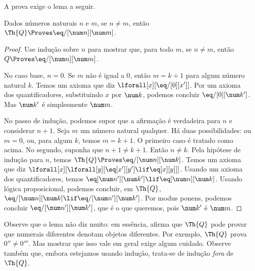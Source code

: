 \documentclass[../../../include/open-logic-section]{subfiles}
\begin{document}
A prova exige o lema a seguir.

\begin{lem}
 Dados números naturais $n$ e $m$, se
$n \neq m$, então $\Th{Q} \Proves \eq/[\num n][\num m]$.
\end{lem}

\begin{proof}
Use indução sobre $n$ para mostrar que, para todo $m$, se $n \neq m$,
então $Q \Proves \eq/[\num n][\num m]$.

No caso base, $n = 0$. Se $m$ não é igual a $0$, então $m = k + 1$
para algum número natural $k$. Temos um axioma que diz
$\lforall[x][\eq/[0][x']]$. Por um axioma dos quantificadores,
substituindo $x$ por $\num k$, podemos concluir
$\eq/[0][\num k']$. Mas $\num k'$ é simplesmente $\num m$.

No passo de indução, podemos supor que a afirmação é verdadeira para
$n$ e considerar $n+1$. Seja $m$ um número natural qualquer. Há duas
possibilidades: ou $m = 0$, ou, para algum $k$, temos $m = k+1$. O
primeiro caso é tratado como acima. No segundo, suponha que
$n+1 \neq k+1$. Então $n \neq k$. Pela hipótese de indução para $n$,
temos $\Th{Q} \Proves \eq/[\num n][\num k]$. Temos um axioma que diz
$\lforall[x][\lforall[y][\eq[x'][y'] \lif \eq[x][y]]]$. Usando um
axioma dos quantificadores, temos
$\eq[\num n'][\num k'] \lif \eq[\num n][\num k]$. Usando lógica
proposicional, podemos concluir, em $\Th{Q}$,
$\eq/[\num n][\num k] \lif \eq/[\num n'][\num k']$. Por modus ponens,
podemos concluir $\eq/[\num n'][\num k']$, que é o que queremos, pois
$\num k'$ é $\num m$.
\end{proof}

\begin{explain}
Observe que o lema não diz muito: em essência, afirma que $\Th{Q}$
pode provar que numerais diferentes denotam objetos diferentes. Por
exemplo, $\Th{Q}$ prova $0'' \neq 0'''$. Mas mostrar que isso vale em
geral exige algum cuidado. Observe também que, embora estejamos usando
indução, trata-se de indução \emph{fora} de $\Th{Q}$.
\end{explain}
\end{document}
